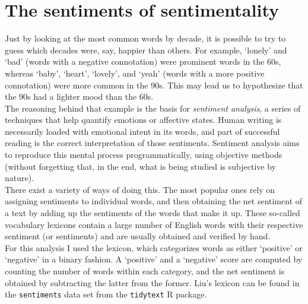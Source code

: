 \documentclass{article}
\begin{document}



\section*{The sentiments of sentimentality}


Just by looking at the most common words by decade, it is possible to try to guess which decades were, say, happier than others. For example, `lonely' and `bad' (words with a negative connotation) were prominent words in the 60s, whereas `baby', `heart', `lovely', and `yeah' (words with a more positive connotation) were more common in the 90s. This may lead us to hypothesize that the 90s had a lighter mood than the 60s. \\


The reasoning behind that example is the basis for \textit{sentiment analysis}, a series of techniques that help quantify emotions or affective states. Human writing is necessarily loaded with emotional intent in its words, and part of successful reading is the correct interpretation of those sentiments. Sentiment analysis aims to reproduce this mental process programmatically, using objective methods (without forgetting that, in the end, what is being studied is subjective by nature). \\



There exist a variety of ways of doing this. The most popular ones rely on assigning sentiments to individual words, and then obtaining the net sentiment of a text by adding up the sentiments of the words that make it up. These so-called vocabulary lexicons contain a large number of English words with their respective sentiment (or sentiments) and are usually obtained and verified by hand. \\




For this analysis I used the \cite{Liu_sentiments} lexicon, which categorizes words as either `positive' or `negative' in a binary fashion. A `positive' and a `negative' score are computed by counting the number of words within each category, and the net sentiment is obtained by subtracting the latter from the former. Liu's lexicon can be found in the \texttt{sentiments} data set from the \texttt{tidytext} \textsf{R} package. \\
\end{document}
